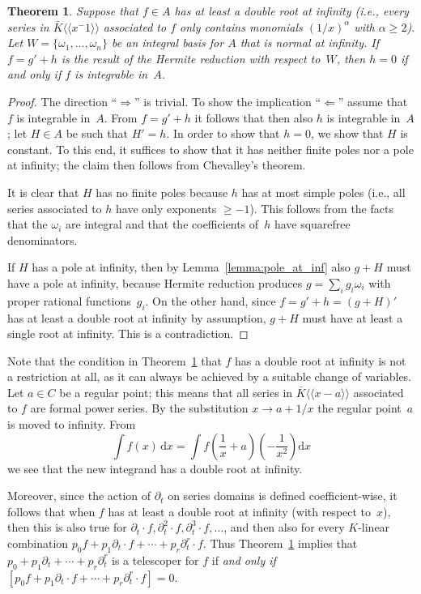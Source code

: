 \documentclass{sig-alternate-05-2015}
\newtheorem{theorem}{Theorem}
\def\<#1>{\langle\!\langle#1\rangle\!\rangle} %
\begin{document}
\begin{theorem}\label{thm:intiff0}
  Suppose that $f\in A$
  has at least a double root at infinity (i.e., every series in $\bar K\<x^{-1}>$
  associated to $f$ only contains monomials $(1/x)^\alpha$ with $\alpha\geq2$).
  Let $W=\{\omega_1,\dots,\omega_n\}$
  be an integral basis for $A$ that is normal at infinity.
  If $f=g'+h$ is the result of the Hermite reduction with respect to~$W$,
  then $h=0$ if and only if $f$ is integrable in~$A$.
\end{theorem}

\begin{proof}
The direction ``$\Rightarrow$'' is trivial. To show the implication
``$\Leftarrow$'' assume that $f$ is integrable in~$A$. From $f=g'+h$ it follows that
then also $h$ is integrable in~$A$; let $H\in A$ be such that $H'=h$.  In order to show
that $h=0$, we show that $H$ is constant.  To this end, it suffices to show that
it has neither finite poles nor a pole at infinity; the claim then follows from
Chevalley's theorem.

It is clear that $H$ has no finite poles because $h$ has at most simple poles
(i.e., all series associated to $h$ have only exponents $\geq-1$).
This follows from the facts that the $\omega_i$ are integral and that
the coefficients of~$h$ have squarefree denominators.

If $H$ has a pole at infinity, then by Lemma~\ref{lemma:pole_at_inf} also
$g+H$ must have a pole at infinity, because Hermite reduction produces
$g=\sum_i g_i\omega_i$ with proper rational functions~$g_i$.  On the other
hand, since $f=g'+h=(g+H)'$ has at least a double root at infinity by
assumption, $g+H$ must have at least a single root at infinity. This is
a contradiction.
\end{proof}

Note that the condition in Theorem~\ref{thm:intiff0} that $f$ has a double
root at infinity is not a restriction at all, as it can always be achieved by
a suitable change of variables. Let $a\in C$ be a regular point; this means
that all series in $\bar K\<x-a>$ associated to $f$ are formal power series. By the substitution
$x\to a+1/x$ the regular point~$a$ is moved to infinity. From
\[
  \int f(x) \,\mathrm{d}x = \int f\left(\frac{1}{x}+a\right)\left(-\frac{1}{x^2}\right) \mathrm{d}x
\]
we see that the new integrand has a double root at infinity.

Moreover, since the action of $\partial_t$ on series domains is defined coefficient-wise,
it follows that when $f$ has at least a double root at infinity (with respect to~$x$),
then this is also true for $\partial_t\cdot f, \partial_t^2\cdot f, \partial_t^3\cdot f,\dots$,
and then also for every $K$-linear combination $p_0f+p_1\partial_t\cdot f+\cdots+p_r\partial_t^r\cdot f$.
Thus Theorem~\ref{thm:intiff0} implies that $p_0+p_1\partial_t+\cdots+p_r\partial_t^r$ is a telescoper for $f$ if
\emph{and only if} $[p_0f+p_1\partial_t\cdot f+\cdots+p_r\partial_t^r\cdot f]=0$.
\end{document}
